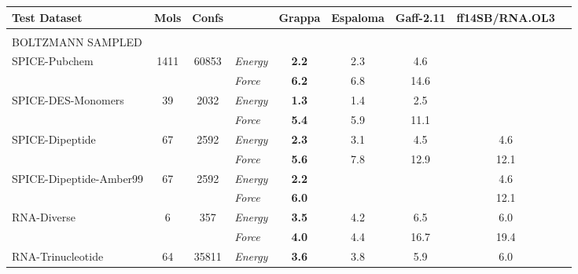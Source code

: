 \documentclass[varwidth]{standalone}
\newcommand{\widthbetweentype}{7pt}
\begin{document}
\begin{adjustbox}{width=\textwidth,center}
\centering

\renewcommand{\arraystretch}{1.0} %

\begin{tabular}{l c c l c c c c c}

\hline
\hline
Test Dataset & Mols & Confs & & Grappa & Espaloma & Gaff-2.11 & ff14SB/RNA.OL3 \\
\hline
\multicolumn{8}{l}{\vspace{\widthbetweentype}} \\[-1em]
\multicolumn{8}{l}{\small{BOLTZMANN SAMPLED}} \\\hline
\multirow{2}{*}{SPICE-Pubchem} & \multirow{2}{*}{1411} & \multirow{2}{*}{60853} & \textit{Energy} & \textbf{2.2} & 2.3 & 4.6 & \\
                                   &                       &                         & \textit{Force}  & \textbf{6.2} & 6.8 & 14.6 & \\
\hline
\multirow{2}{*}{SPICE-DES-Monomers} & \multirow{2}{*}{39} & \multirow{2}{*}{2032} & \textit{Energy} & \textbf{1.3} & 1.4 & 2.5 & \\
                                   &                       &                         & \textit{Force}  & \textbf{5.4} & 5.9 & 11.1 & \\
\hline
\multirow{2}{*}{SPICE-Dipeptide} & \multirow{2}{*}{67} & \multirow{2}{*}{2592} & \textit{Energy} & \textbf{2.3} & 3.1 & 4.5 & 4.6\\
                                   &                       &                         & \textit{Force}  & \textbf{5.6} & 7.8 & 12.9 & 12.1\\
\hline
\multirow{2}{*}{SPICE-Dipeptide-Amber99} & \multirow{2}{*}{67} & \multirow{2}{*}{2592} & \textit{Energy} & \textbf{2.2} &  &  & 4.6\\
                                   &                       &                         & \textit{Force}  & \textbf{6.0} &  &  & 12.1\\
\hline
\multirow{2}{*}{RNA-Diverse} & \multirow{2}{*}{6} & \multirow{2}{*}{357} & \textit{Energy} & \textbf{3.5} & 4.2 & 6.5 & 6.0\\
                                   &                       &                         & \textit{Force}  & \textbf{4.0} & 4.4 & 16.7 & 19.4\\
\hline
\multirow{2}{*}{RNA-Trinucleotide} & \multirow{2}{*}{64} & \multirow{2}{*}{35811} & \textit{Energy} & \textbf{3.6} & 3.8 & 5.9 & 6.0\\

\end{tabular}
\end{adjustbox}
\end{document}
